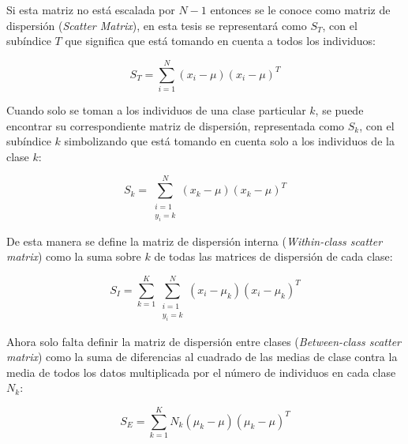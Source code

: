 Si esta matriz no está escalada por $N-1$ entonces se le conoce como matriz de dispersión (\textit{Scatter Matrix}), en esta tesis se representará como $S_T$, con el subíndice $T$ que significa que está tomando en cuenta a todos los individuos:

\begin{equation} \label{eq:2.2}
S_T = \sum_{i=1}^{N}(x_i - \mu)(x_i - \mu)^T	
\end{equation}

Cuando solo se toman a los individuos de una clase particular $k$, se puede encontrar su correspondiente matriz de dispersión, representada como $S_k$, con el subíndice $k$ simbolizando que está tomando en cuenta solo a los individuos de la clase $k$:

\begin{equation*}
S_k = \sum_{\substack{i=1 \\ y_i = k}}^{N} (x_k - \mu)(x_k - \mu)^T	
\end{equation*}

De esta manera se define la matriz de dispersión interna (\textit{Within-class scatter matrix}) como la suma sobre $k$ de todas las matrices de dispersión de cada clase:

\begin{equation}\label{eq:2.3}
S_I = \sum_{k=1}^{K} 
					\sum_{\substack{i = 1\\
                  			   	y_i = k}}
                    ^{N}
 ({x_i-\mu_{k}})({x_i-\mu_{k}})^T 	
\end{equation}

Ahora solo falta definir la matriz de dispersión entre clases (\textit{Between-class scatter matrix}) como la suma de diferencias al cuadrado de las medias de clase contra la media de todos los datos multiplicada por el número de individuos en cada clase $N_k$:

\begin{equation} \label{eq:2.4}
S_E = \sum_{k = 1}^K N_k (\mu_k - \mu)(\mu_k - \mu)^T	
\end{equation}

